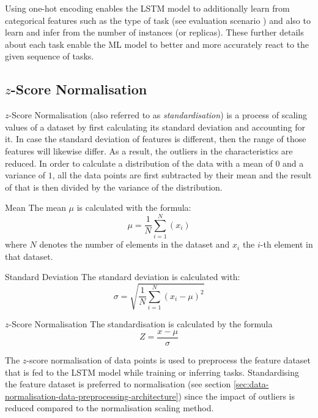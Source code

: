     Using one-hot encoding enables the LSTM model to additionally learn from categorical features such as the type of task (see evaluation scenario ) and also to learn and infer from the number of instances (or  replicas). 
    These further details about each task enable the ML model to better and more accurately react to the given sequence of tasks.

    \subsection{$z$-Score Normalisation}
    \label{sec:data-standardisation-data-preprocessing-architecture}
      $z$-Score Normalisation (also referred to as \emph{standardisation}) is a process of scaling values of a dataset by first calculating its standard deviation and accounting for it. In case the standard deviation of features is different, then the range of those features will likewise differ. As a result, the outliers in the characteristics are reduced.
      In order to calculate a distribution of the data with a mean of $0$ and a variance of $1$, all the data points are first subtracted by their mean and the result of that is then divided by the variance of the distribution.

      \begin{pabox}{Mean}
        \label{def:mean}
        The mean $\mu$ is calculated with the formula:
        $$\mu = \frac{1}{N}\sum_{i = 1}^{N}\left(x_i\right)$$
        where $N$ denotes the number of elements in the dataset and $x_i$ the $i$-th element in that dataset.
      \end{pabox}

      \begin{pabox}{Standard Deviation}
      \label{def:standard-deviation}
        The standard deviation is calculated with:
        $$\sigma = \sqrt{\frac{1}{N} \sum_{i = 1}^{N}\left(x_i - \mu\right)^2}$$
      \end{pabox}

      \begin{pabox}{$z$-Score Normalisation}
      \label{def:standardisation}
        The standardisation is calculated by the formula $$Z = \frac{x - \mu}{\sigma}$$
      \end{pabox}

      The $z$-score normalisation of data points is used to preprocess the feature dataset that is fed to the LSTM model while training or inferring tasks. Standardising the feature dataset is preferred to normalisation (see section \ref{sec:data-normalisation-data-preprocessing-architecture}) since the impact of outliers is reduced compared to the normalisation scaling method.

